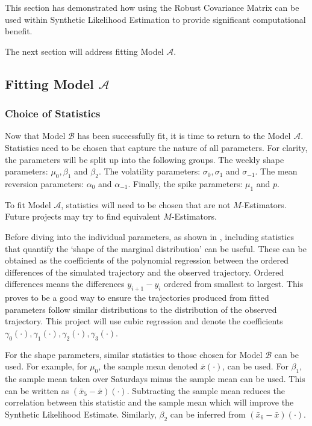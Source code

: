 This section has demonstrated how using the Robust Covariance Matrix can be used within Synthetic Likelihood Estimation to provide significant computational benefit.

The next section will address fitting Model $\mathcal{A}$.

\subsection{Fitting Model \texorpdfstring{$\mathcal{A}$}{A}}
\label{subsec:fit-full-model}

\subsubsection{Choice of Statistics}
\label{subsec:full-stats}

Now that Model $\mathcal{B}$ has been successfully fit, it is time to return to the Model $\mathcal{A}$. Statistics need to be chosen that capture the nature of all parameters. For clarity, the parameters will be split up into the following groups. The weekly shape parameters: $\mu_0, \beta_1$ and $\beta_2$. The volatility parameters: $\sigma_0, \sigma_1$ and $\sigma_{-1}$. The mean reversion parameters: $\alpha_0$ and $\alpha_{-1}$. Finally, the spike parameters: $\mu_1$ and $p$.

To fit Model $\mathcal{A}$, statistics will need to be chosen that are not $M$-Estimators. Future projects may try to find equivalent $M$-Estimators.

Before diving into the individual parameters, as shown in \cite{wood_2010}, including statistics that quantify the `shape of the marginal distribution' can be useful. These can be obtained as the coefficients of the polynomial regression between the ordered differences of the simulated trajectory and the observed trajectory. Ordered differences means the differences $y_{i+1} - y_i$ ordered from smallest to largest. This proves to be a good way to ensure the trajectories produced from fitted parameters follow similar distributions to the distribution of the observed trajectory. This project will use cubic regression and denote the coefficients $\gamma_0(\cdot), \gamma_1(\cdot), \gamma_2(\cdot), \gamma_3(\cdot)$.

For the shape parameters, similar statistics to those chosen for Model $\mathcal{B}$ can be used. For example, for $\mu_0$, the sample mean denoted $\bar{x}(\cdot)$, can be used. For $\beta_1$, the sample mean taken over Saturdays minus the sample mean can be used. This can be written as $(\bar{x}_5 - \bar{x})(\cdot)$. Subtracting the sample mean reduces the correlation between this statistic and the sample mean which will improve the Synthetic Likelihood Estimate. Similarly, $\beta_2$ can be inferred from $(\bar{x}_6 - \bar{x})(\cdot)$.

